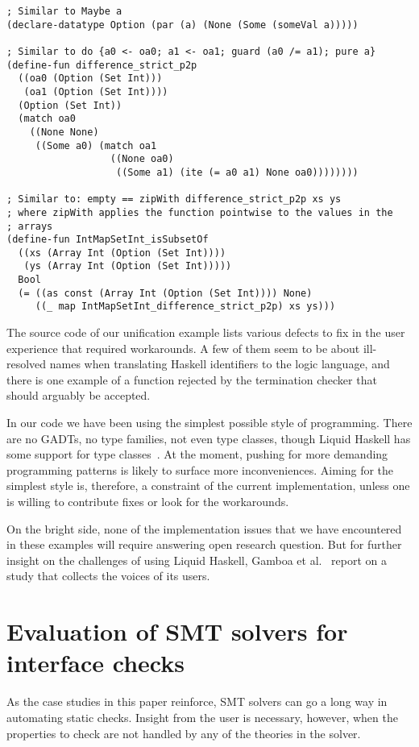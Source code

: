 \documentclass[sigconf, anonymous, review]{acmart}
\begin{document}
\begin{verbatim}
; Similar to Maybe a
(declare-datatype Option (par (a) (None (Some (someVal a)))))

; Similar to do {a0 <- oa0; a1 <- oa1; guard (a0 /= a1); pure a}
(define-fun difference_strict_p2p
  ((oa0 (Option (Set Int)))
   (oa1 (Option (Set Int))))
  (Option (Set Int))
  (match oa0
    ((None None)
     ((Some a0) (match oa1
                  ((None oa0)
                   ((Some a1) (ite (= a0 a1) None oa0))))))))

; Similar to: empty == zipWith difference_strict_p2p xs ys
; where zipWith applies the function pointwise to the values in the
; arrays
(define-fun IntMapSetInt_isSubsetOf
  ((xs (Array Int (Option (Set Int))))
   (ys (Array Int (Option (Set Int)))))
  Bool
  (= ((as const (Array Int (Option (Set Int)))) None)
     ((_ map IntMapSetInt_difference_strict_p2p) xs ys)))
\end{verbatim}

The source code of our unification example lists various defects to fix
in the user experience that required workarounds. A few of them seem to
be about ill-resolved names when translating Haskell identifiers to the
logic language, and there is one example of a function rejected by the
termination checker that should arguably be accepted.

In our code we have been using the simplest possible style of programming.
There are no GADTs, no type families, not even type classes, though
Liquid Haskell has some support for type classes~\cite{liu20}. At the moment,
pushing for more demanding programming patterns is likely to surface more
inconveniences. Aiming for the simplest style is, therefore, a constraint of
the current implementation, unless one is willing to contribute fixes or
look for the workarounds.

On the bright
side, none of the implementation issues that we have encountered in these
examples will require answering open research question.
But for further insight on the challenges of using Liquid Haskell,
Gamboa et al.~\cite{gamboa25} report on a study that collects the voices
of its users.

\section{Evaluation of SMT solvers for interface checks}
\label{SMT-solvers-for-interface-checks}

As the case studies in this paper reinforce, SMT solvers can go a long way in
automating static checks. Insight from the user is necessary, however,
when the properties to check are not handled by any of the theories in the
solver.
\end{document}
